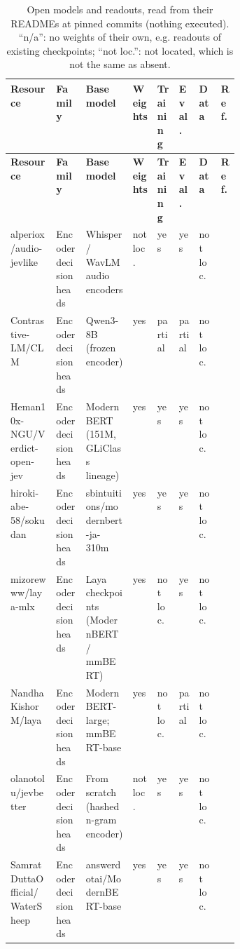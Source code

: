 {\footnotesize
\begin{xltabular}{\linewidth}{>{\raggedright\arraybackslash}p{0.2\linewidth}>{\raggedright\arraybackslash}p{0.13\linewidth}>{\raggedright\arraybackslash}Xllllp{0.05\linewidth}}
\caption{Open models and readouts, read from their READMEs at pinned commits (nothing executed). “n/a”: no weights of their own, e.g. readouts of existing checkpoints; “not loc.”: not located, which is not the same as absent.}\label{tab:ecosystem}\\
\toprule
\textbf{Resource} & \textbf{Family} & \textbf{Base model} & \textbf{Weights} & \textbf{Training} & \textbf{Eval.} & \textbf{Data} & \textbf{Ref.} \\
\midrule
\endfirsthead
\toprule
\textbf{Resource} & \textbf{Family} & \textbf{Base model} & \textbf{Weights} & \textbf{Training} & \textbf{Eval.} & \textbf{Data} & \textbf{Ref.} \\
\midrule
\endhead
alperiox/\allowbreak{}audio-jevlike & Encoder decision heads & Whisper /\allowbreak{} WavLM audio encoders & not loc. & yes & yes & not loc. & \citep{gh_alperiox_audio_jevlike} \\
Contrastive-LM/\allowbreak{}CLM & Encoder decision heads & Qwen3-8B (frozen encoder) & yes & partial & partial & not loc. & \citep{gh_contrastive_lm_clm} \\
Heman10x-NGU/\allowbreak{}Verdict-open-jev & Encoder decision heads & ModernBERT (151M, GLiClass lineage) & yes & yes & yes & not loc. & \citep{gh_heman10x_ngu_verdict_open_jev} \\
hiroki-abe-58/\allowbreak{}sokudan & Encoder decision heads & sbintuitions/\allowbreak{}modernbert-ja-310m & yes & yes & yes & not loc. & \citep{gh_hiroki_abe_58_sokudan} \\
mizorewww/\allowbreak{}laya-mlx & Encoder decision heads & Laya checkpoints (ModernBERT /\allowbreak{} mmBERT) & yes & not loc. & yes & not loc. & \citep{gh_mizorewww_laya_mlx} \\
NandhaKishorM/\allowbreak{}laya & Encoder decision heads & ModernBERT-large; mmBERT-base & yes & not loc. & partial & not loc. & \citep{gh_nandhakishorm_laya} \\
olanotolu/\allowbreak{}jevbetter & Encoder decision heads & From scratch (hashed n-gram encoder) & not loc. & yes & yes & not loc. & \citep{gh_olanotolu_jevbetter} \\
SamratDuttaOfficial/\allowbreak{}WaterSheep & Encoder decision heads & answerdotai/\allowbreak{}ModernBERT-base & yes & yes & yes & not loc. & \citep{gh_samratduttaofficial_watersheep} \\

\end{xltabular}}
